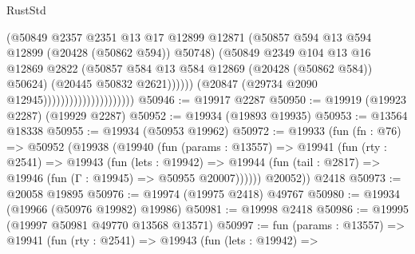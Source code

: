 \begin{lexlean}{RustStd}
\begin{coremodule}
                                                (@50849
                                                  @2357
                                                  @2351
                                                  @13
                                                  @17
                                                  @12899
                                                  @12871
                                                  (@50857
                                                    @594
                                                    @13
                                                    @594
                                                    @12899
                                                    (@20428 (@50862 @594))
                                                    @50748)
                                                  (@50849
                                                    @2349
                                                    @104
                                                    @13
                                                    @16
                                                    @12869
                                                    @2822
                                                    (@50857
                                                      @584
                                                      @13
                                                      @584
                                                      @12869
                                                      (@20428 (@50862 @584))
                                                      @50624)
                                                    (@20445 @50832 @2621))))))
                                          (@20847 (@29734 @2090 @12945)))))))))))))))))))))
@50946 := @19917 @2287
@50950 := @19919 (@19923 @2287) (@19929 @2287)
@50952 := @19934 (@19893 @19935)
@50953 := @13564 @18338
@50955 := @19934 (@50953 @19962)
@50972 := @19933
    (fun (fn : @76) =>
    @50952
      (@19938
        (@19940
          (fun (params : @13557) =>
          @19941
            (fun (rty : @2541) =>
            @19943
              (fun (lets : @19942) =>
              @19944 (fun (tail : @2817) => @19946 (fun (Γ : @19945) => @50955 @20007))))))
        @20052))
    @2418
@50973 := @20058 @19895
@50976 := @19974 (@19975 @2418) @49767
@50980 := @19934 (@19966 (@50976 @19982) @19986)
@50981 := @19998 @2418
@50986 := @19995 (@19997 @50981 @49770 @13568 @13571)
@50997 := fun (params : @13557) =>
  @19941
    (fun (rty : @2541) =>
    @19943
      (fun (lets : @19942) =>

\end{coremodule}
\end{lexlean}
